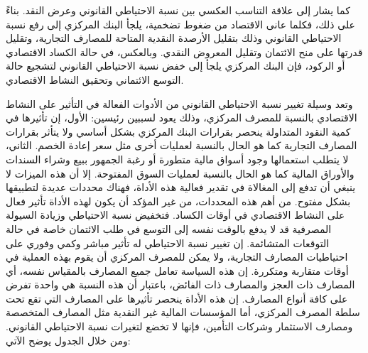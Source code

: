 \documentclass[10pt,a4paper]{report}
\begin{document}
\begin{doublespacing}
كما يشار إلى علاقة التناسب العكسي بين نسبة الاحتياطي القانوني وعرض النقد. بناءً على ذلك، فكلما عانى الاقتصاد من ضغوط تضخمية، يلجأ البنك المركزي إلى رفع نسبة الاحتياطي القانوني وذلك بتقليل الأرصدة النقدية المتاحة للمصارف التجارية، وتقليل قدرتها على منح الائتمان وتقليل المعروض النقدي. وبالعكس، في حالة الكساد الاقتصادي أو الركود، فإن البنك المركزي يلجأ إلى خفض نسبة الاحتياطي القانوني لتشجيع حالة التوسع الائتماني وتحقيق النشاط الاقتصادي.

وتعد وسيلة تغيير نسبة الاحتياطي القانوني  من الأدوات الفعالة في التأثير على النشاط الاقتصادي بالنسبة للمصرف المركزي، وذلك يعود لسببين رئيسين: الأول، إن تأثيرها في كمية النقود المتداولة ينحصر بقرارات البنك المركزي بشكل أساسي ولا يتأثر بقرارات المصارف التجارية كما هو الحال بالنسبة لعمليات أخرى مثل سعر إعادة الخصم. الثاني، لا يتطلب استعمالها وجود أسواق مالية متطورة أو رغبة الجمهور ببيع وشراء السندات والأوراق المالية كما هو الحال بالنسبة لعمليات السوق المفتوحة. إلا أن هذه الميزات لا ينبغي أن تدفع إلى المغالاة في تقدير فعالية هذه الأداة، فهناك محددات عديدة لتطبيقها بشكل مفتوح. من أهم هذه المحددات، من غير المؤكد أن يكون لهذه الأداة تأثير فعال على النشاط الاقتصادي في أوقات الكساد. فتخفيض نسبة الاحتياطي وزيادة السيولة المصرفية قد لا يدفع بالوقت نفسه إلى التوسع في طلب الائتمان خاصة في حالة التوقعات المتشائمة. إن تغيير نسبة الاحتياطي له تأثير مباشر وكمي وفوري على احتياطيات المصارف التجارية، ولا يمكن للمصرف المركزي أن يقوم بهذه العملية في أوقات متقاربة ومتكررة. إن هذه السياسة تعامل جميع المصارف بالمقياس نفسه، أي المصارف ذات العجز والمصارف ذات الفائض، باعتبار أن هذه النسبة هي واحدة تفرض على كافة أنواع المصارف. إن هذه الأداة ينحصر تأثيرها على المصارف التي تقع تحت سلطة المصرف المركزي، أما المؤسسات المالية غير النقدية مثل المصارف المتخصصة ومصارف الاستثمار وشركات التأمين، فإنها لا تخضع لتغيرات نسبة الاحتياطي القانوني. ومن خلال الجدول يوضح الآتي:
\begin{table}[H]
	\captionsetup{font=Large}  %
	\fontsize{14}{12}\selectfont
	\centering
	\caption{عرض النقد في العراق للمدة 2010-2021}
	\label{tab:8.3}
\end{table}
\end{doublespacing}
\end{document}
